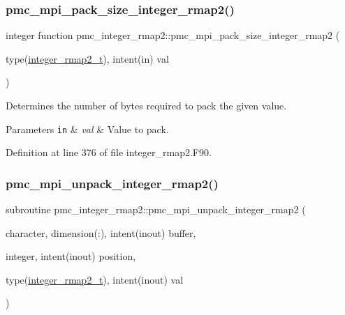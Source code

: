 \subsubsection{\texorpdfstring{pmc\+\_\+mpi\+\_\+pack\+\_\+size\+\_\+integer\+\_\+rmap2()}{pmc\_mpi\_pack\_size\_integer\_rmap2()}}
{\footnotesize\ttfamily integer function pmc\+\_\+integer\+\_\+rmap2\+::pmc\+\_\+mpi\+\_\+pack\+\_\+size\+\_\+integer\+\_\+rmap2 (\begin{DoxyParamCaption}\item[{type(\mbox{\hyperlink{structpmc__integer__rmap2_1_1integer__rmap2__t}{integer\+\_\+rmap2\+\_\+t}}), intent(in)}]{val }\end{DoxyParamCaption})}



Determines the number of bytes required to pack the given value. 


\begin{DoxyParams}[1]{Parameters}
\mbox{\tt in}  & {\em val} & Value to pack. \\
\hline
\end{DoxyParams}


Definition at line 376 of file integer\+\_\+rmap2.\+F90.

\mbox{\label{namespacepmc__integer__rmap2_a803859f2ba244b1035bba011911a1b31}} 
\subsubsection{\texorpdfstring{pmc\+\_\+mpi\+\_\+unpack\+\_\+integer\+\_\+rmap2()}{pmc\_mpi\_unpack\_integer\_rmap2()}}
{\footnotesize\ttfamily subroutine pmc\+\_\+integer\+\_\+rmap2\+::pmc\+\_\+mpi\+\_\+unpack\+\_\+integer\+\_\+rmap2 (\begin{DoxyParamCaption}\item[{character, dimension(\+:), intent(inout)}]{buffer,  }\item[{integer, intent(inout)}]{position,  }\item[{type(\mbox{\hyperlink{structpmc__integer__rmap2_1_1integer__rmap2__t}{integer\+\_\+rmap2\+\_\+t}}), intent(inout)}]{val }\end{DoxyParamCaption})}




